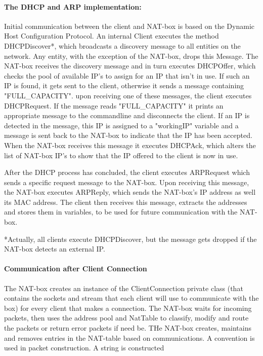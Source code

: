 \documentclass[12pt, a4paper]{article}
\begin{document}
\paragraph{The DHCP and ARP implementation:}
Initial communication between the client and NAT-box is based on the Dynamic Host Configuration Protocol. An internal Client executes the method DHCPDiscover*, which broadcasts a discovery message to all entities on the network. Any entity, with the exception of the NAT-box, drops this Message. The NAT-box receives the discovery message and in turn executes DHCPOffer, which checks the pool of available IP's to assign for an IP that isn't in use. If such an IP is found, it gets sent to the client, otherwise it sends a message containing "FULL\_CAPACITY". upon receiving one of these messages, the client executes DHCPRequest. If the message reads "FULL\_CAPACITY" it prints an appropriate message to the commandline and disconnects the client. If an IP is detected in the message, this IP is assigned to a "workingIP" variable and a message is sent back to the NAT-box to indicate that the IP has been accepted. When the NAT-box receives this message it executes DHCPAck, which alters the list of NAT-box IP's to show that the IP offered to the client is now in use.

After the DHCP process has concluded, the client executes ARPRequest which sends a specific request message to the NAT-box. Upon receiving this message, the NAT-box executes ARPReply, which sends the NAT-box's IP address as well its MAC address. The client then receives this message, extracts the addresses and stores them in variables, to be used for future communication with the NAT-box.

*Actually, all clients execute DHCPDiscover, but the message gets dropped if the NAT-box detects an external IP.

\paragraph{Communication after Client Connection}
The NAT-box creates an instance of the ClientConnection private class (that contains the sockets and stream that each client will use to communicate with the box) for every client that makes a connection.
The NAT-box waits for incoming packets, then uses the address pool and NatTable to classify, modify and route the packets or return error packets if need be. THe NAT-box creates, maintains and removes entries in the NAT-table based on communications.
A convention is used in packet construction. A string is constructed
\end{document}
